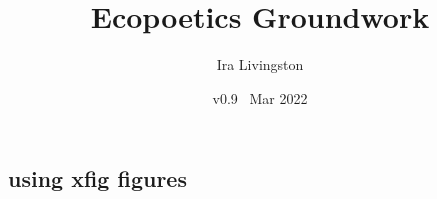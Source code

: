 \documentclass[draft]{article}
\title{Ecopoetics Groundwork}
\author{Ira Livingston}
\date{v0.9 \ Mar 2022}
\begin{document}
\maketitle
\subsection{using xfig figures}

\def\Canflagshape{%
{32.0}
{0}b{0}\\
{0}t{0}{16}\\
{32}t{0}{16}\\
{32}e{0}\\
%
{2.800} b{32.000}\\
{6.250} b{27.000} t{30.160}{3.680} b{37.000}\\
{7.300} t{27.217}{1.654} t{29.600}{4.800} t{35.128}{1.654}\\
{7.400} t{27.238}{1.812} j t{29.050}{5.900} j t{34.950}{1.812}\\
{10.45} b{24.500} t{27.869}{8.262} b{39.500}\\
{11.80} b{19.900} t{23.984}{1.768} t{28.148}{7.703} t{38.248}{1.768} b{44.100}\\
{12.15} t{20.005}{2.651} t{23.850}{2.227} t{28.221}{7.559} t{37.923}{2.227} t{41.344}{2.651}\\
{12.20} t{20.021}{3.029} j t{23.050}{3.073} t{28.231}{7.538} t{37.877}{3.073} j t{40.950}{3.029}\\
{13.50} t{20.412}{6.917} t{28.500}{7.000} t{36.671}{6.917}\\
{13.90} t{20.533}{7.167} j t{27.700}{8.600} j t{36.300}{7.167}\\
{15.45} t{21.000}{22.000}\\
{16.00} t{21.000}{22.000}\\
{17.00} t{19.550}{24.900}\\
{22.05} t{25.900}{12.200}\\
{22.60} t{25.900}{12.200}\\
{23.55} t{25.489}{5.961} s t{31.450}{1.100} s t{32.550}{5.961}\\
{24.00} t{25.295}{2.980} t{31.600}{0.800} t{35.725}{2.980}\\
{24.45} e{25.100} t{31.593}{0.815} e{38.900}\\
{30.00} t{31.500}{1.000}\\
{30.00} e{32.0}\\
%
{0}b{48}\\
{0}t{48}{16}\\
{32}t{48}{16}\\
{32}e{48}
}
\end{document}
